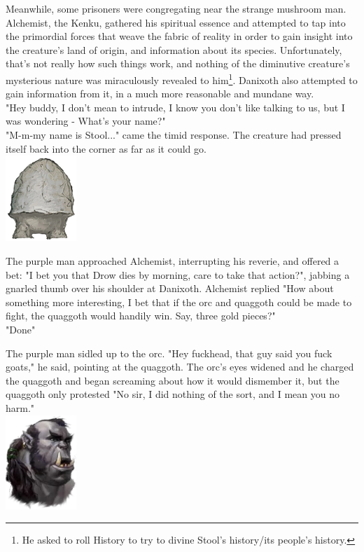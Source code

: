 \documentclass[letterpaper,10pt,twoside,twocolumn,openany]{book}
\begin{document}
Meanwhile, some prisoners were congregating near the strange mushroom man. Alchemist, the Kenku, gathered his spiritual essence and attempted to tap into the primordial forces that weave the fabric of reality in order to gain insight into the creature's land of origin, and information about its species. Unfortunately, that's not really how such things work, and nothing of the diminutive creature's mysterious nature was miraculously revealed to him\footnote{He asked to roll History to try to divine Stool's history/its people's history.}. Danixoth also attempted to gain information from it, in a much more reasonable and mundane way.\\
"Hey buddy, I don't mean to intrude, I know you don't like talking to us, but I was wondering - What's your name?"\\
"M-m-my name is Stool..." came the timid response. The creature had pressed itself back into the corner as far as it could go.\\
{\centering
	\includegraphics[width=0.2\textwidth]{img/dist/stool.png}
}

The purple man approached Alchemist, interrupting his reverie, and offered a bet: "I bet you that Drow dies by morning, care to take that action?", jabbing a gnarled thumb over his shoulder at Danixoth. Alchemist replied "How about something more interesting, I bet that if the orc and quaggoth could be made to fight, the quaggoth would handily win. Say, three gold pieces?"\\
"Done"

The purple man sidled up to the orc. "Hey fuckhead, that guy said you fuck goats," he said, pointing at the quaggoth. The orc's eyes widened and he charged the quaggoth and began screaming about how it would dismember it, but the quaggoth only protested "No sir, I did nothing of the sort, and I mean you no harm."\\
{
	\centering
	\includegraphics[width=0.2\textwidth]{img/dist/orc-prisoner.png}
}
\end{document}
